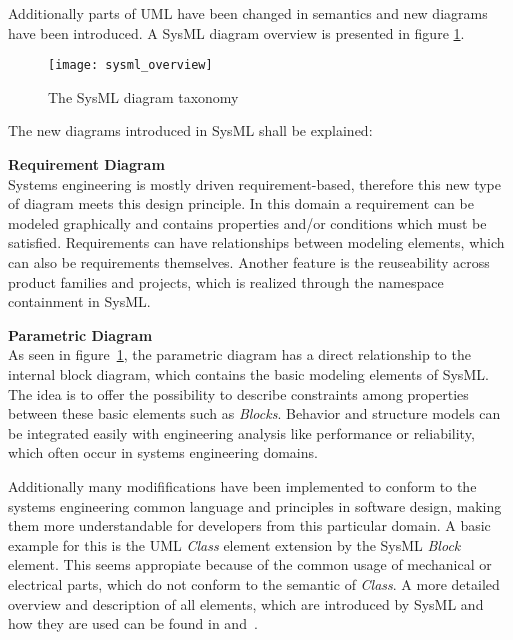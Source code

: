 Additionally parts of \ac{UML} have been changed in semantics and new diagrams
have been introduced. A \ac{SysML} diagram overview is presented in figure
\ref{sysml_overview}.

\begin{figure}[h!]
\begin{center}
\texttt{[image: sysml\_overview]}\\
\end{center}
\caption{The SysML diagram taxonomy~\cite{OMGSysMLSpecification}}
\label{sysml_overview}
\end{figure}

 The new diagrams introduced in \ac{SysML} shall be explained:
 
\textbf{Requirement Diagram}\\
Systems engineering is mostly driven requirement-based, therefore this new type
of diagram meets this design principle. In this domain a requirement can be
modeled graphically and contains properties and/or conditions which must be
satisfied. Requirements can have relationships between modeling elements, which
can also be requirements themselves. Another feature is the reuseability across
product families and projects, which is realized through the namespace
containment in \ac{SysML}.

\textbf{Parametric Diagram}\\
As seen in figure~\ref{sysml_overview}, the parametric diagram has a direct
relationship to the internal block diagram, which contains the basic modeling
elements of \ac{SysML}. The idea is to offer the possibility to describe
constraints among properties between these basic elements such as
\textit{Blocks}.
Behavior and structure models can be integrated easily with engineering analysis like
performance or reliability, which often occur in systems engineering domains.

Additionally many modififications have been implemented to conform to the
systems engineering common language and principles in software design, making
them more understandable for developers from this particular domain. A basic
example for this is the \ac{UML} \textit{Class} element extension by
the \ac{SysML} \textit{Block} element. This seems appropiate because of the common usage of mechanical or electrical parts, which do not conform to the semantic of \textit{Class}.
A more detailed overview and description of all elements, which are
introduced by \ac{SysML} and how they are used can be found in
\cite{OMGSysMLSpecification} and~\cite{SysMLEngineering}.
